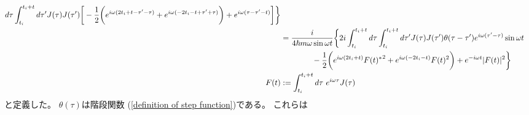 \begin{subequations}
\begin{align}
        d\tau
    \int_{t_i}^{t_i + t}
        d\tau'
    J(\tau) J(\tau')
    \bigg[
    -
    \dfrac{1}{2}
    \bigg(
        e^{ i \omega (2 t_i + t - \tau' - \tau) }
    +
        e^{ i \omega ( - 2 t_i - t + \tau' + \tau) }
    \bigg)
    +
        e^{ i \omega (\tau - \tau' - t) }
    \bigg]
    \bigg\}
\notag\\&
    =
    \dfrac{i}{4 \hbar m \omega \sin \omega t}
    \bigg\{
    2 i
    \int_{t_i}^{t_i + t}
        d\tau
    \int_{t_i}^{t_i + t}
        d\tau'
    J(\tau) J(\tau')
    \theta(\tau - \tau')
        e^{ i \omega (\tau' - \tau) }
    \sin \omega t
\notag\\&\qquad\qquad
    -
    \dfrac{1}{2}
    \bigg(
        e^{ i \omega (2 t_i + t) }
        { F(t)^* }^2
    +
        e^{ i \omega ( - 2 t_i - t) }
        F(t)^2
    \bigg)
    +
        e^{ - i \omega t }
        | F(t) |^2
    \bigg\}
\\
    F(t)
    &:=
    \int_{t_i}^{t_i + t} d\tau\ 
        e^{i \omega \tau}
        J(\tau)
\end{align}
\end{subequations}
と定義した。
$\theta(\tau)$は階段関数
(\ref{definition of step function})である。
これらは
